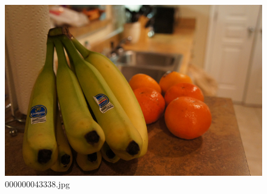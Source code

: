     \begin{figure}[h]
        \centering
        \includegraphics[width=0.8\linewidth]{../image set/easy/000000043338.jpg}
        \caption{000000043338.jpg}
    \end{figure}
